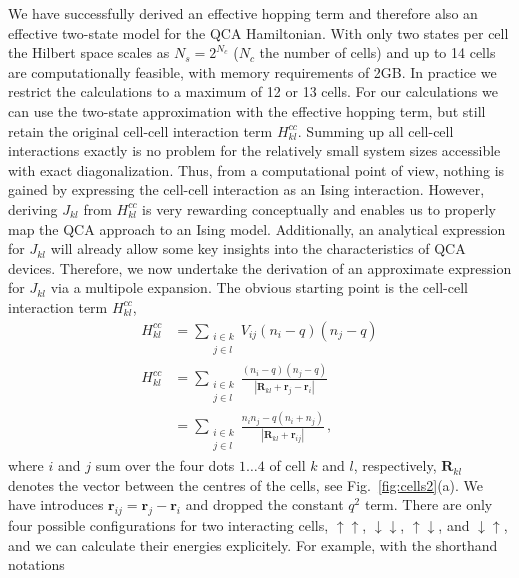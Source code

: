 We have successfully derived an effective hopping term and therefore also an
effective two-state model for the QCA Hamiltonian. With only two states per cell
the Hilbert space scales as $N_s = 2^{N_c}$ ($N_c$ the number of cells) and up
to 14 cells are computationally feasible, with memory requirements of 2GB. In
practice we restrict the calculations to a maximum of 12 or 13 cells. For our
calculations we can use the two-state approximation with the effective hopping
term, but still retain the original cell-cell interaction term $H^{cc}_{kl}$.
Summing up all cell-cell interactions exactly is no problem for the relatively
small system sizes accessible with exact diagonalization.  Thus, from a
computational point of view, nothing is gained by expressing the cell-cell
interaction as an Ising interaction. However, deriving $J_{kl}$ from
$H^{cc}_{kl}$ is very rewarding conceptually and enables us to properly map the
QCA approach to an Ising model. Additionally, an analytical expression for
$J_{kl}$ will already allow some key insights into the characteristics of QCA
devices. Therefore, we now undertake the derivation of an approximate expression
for $J_{kl}$ via a multipole expansion. The obvious starting point is the
cell-cell interaction term $H^{cc}_{kl}$, 
%
\begin{equation}
\begin{split}
  H^{cc}_{kl} 
  &=
  \sum_{\substack{i \in k\\j \in l}} V_{ij} \left( n_i - q \right) \left( n_j - q \right) \\
  H^{cc}_{kl}
  &= 
  \sum_{\substack{i \in k\\j \in l}}
  \frac{ \left( n_i - q \right) \left( n_j - q \right) }
       { \left| \bm{R}_{kl} + \bm{r}_j - \bm{r}_i \right| } \\
  &=
  \sum_{\substack{i \in k\\j \in l}}
  \frac{n_i n_j - q (n_i + n_j)}
       {\left| \bm{R}_{kl} + \bm{r}_{ij} \right|} \, ,
\end{split}
\end{equation}
%
where $i$ and $j$ sum over the four dots $1\ldots4$ of cell $k$ and $l$,
respectively, $\bm{R}_{kl}$ denotes the vector between the centres of the cells,
see Fig.~\ref{fig:cells2}(a). We have introduces $\bm{r}_{ij} = \bm{r}_j -
\bm{r}_i$ and dropped the constant $q^2$ term. There are only four possible
configurations for two interacting cells, $\uparrow\uparrow$,
$\downarrow\downarrow$, $\uparrow\downarrow$, and $\downarrow\uparrow$, and we can
calculate their energies explicitely. For example, with the shorthand notations
